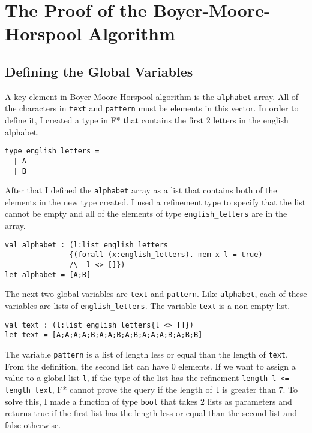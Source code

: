 \chapter{The Proof of the Boyer-Moore-Horspool Algorithm}

\section{Defining the Global Variables}

A key element in Boyer-Moore-Horspool algorithm is the \texttt{alphabet} array. All of the characters in \texttt{text} and \texttt{pattern} must be elements in this vector. In order to define it, I created a type in F* that contains the first \(2\) letters in the english alphabet.

\begin{verbatim}
type english_letters = 
  | A
  | B
\end{verbatim}

After that I defined the \texttt{alphabet} array as a list that contains both of the elements in the new type created. I used a refinement type to specify that the list cannot be empty and all of the elements of type \texttt{english\_letters} are in the array.

\begin{verbatim}
val alphabet : (l:list english_letters
               {(forall (x:english_letters). mem x l = true) 
               /\  l <> []}) 
let alphabet = [A;B]
\end{verbatim}

The next two global variables are \texttt{text} and \texttt{pattern}. Like \texttt{alphabet}, each of these variables are lists of \texttt{english\_letters}. The variable \texttt{text} is a non-empty list.

\begin{verbatim}
val text : (l:list english_letters{l <> []})
let text = [A;A;A;A;B;A;A;B;A;B;A;A;A;B;A;B;B]
\end{verbatim}

The variable \texttt{pattern} is a list of length less or equal than the length of \texttt{text}. From the definition, the second list can have \(0\) elements. If we want to assign a value to a global list \texttt{l}, if the type of the list has the refinement \texttt{length l <= length text}, F* cannot prove the query if the length of \texttt{l} is greater than \(7\). To solve this, I made a function of type \texttt{bool} that takes \(2\) lists as parameters and returns true if the first list has the length less or equal than the second list and false otherwise.

